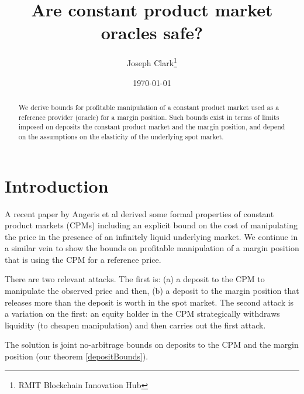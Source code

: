 \documentclass[12pt]{article}
\begin{document}
\begin{titlepage}
\title{Are constant product market oracles safe?}
\author{Joseph Clark\thanks{RMIT Blockchain Innovation Hub} }
\date{\today}
\maketitle
\begin{abstract}
\noindent We derive bounds for profitable manipulation of a constant product market used as a reference provider (oracle) for a margin position. Such bounds exist in terms of limits imposed on deposits the constant product market and the margin position, and depend on the assumptions on the elasticity of the underlying spot market.

\bigskip
\end{abstract}
\setcounter{page}{0}
\thispagestyle{empty}
\end{titlepage}
\pagebreak \newpage




\doublespacing


\section{Introduction} \label{sec:introduction}

A recent paper by Angeris et al \cite{ang20} derived some formal properties of constant product markets (CPMs) including an explicit bound on the cost of manipulating the price in the presence of an infinitely liquid underlying market. We continue in a similar vein to show the bounds on profitable manipulation of a margin position that is using the CPM for a reference price.  

There are two relevant attacks. The first is: (a) a deposit to the CPM to manipulate the observed price and then, (b) a deposit to the margin position that releases more than the deposit is worth in the spot market. The second attack is a variation on the first: an equity holder in the CPM strategically withdraws liquidity (to cheapen manipulation) and then carries out the first attack.

The solution is joint no-arbitrage bounds on deposits to the CPM and the margin position (our theorem \ref{depositBounds}).
\end{document}
